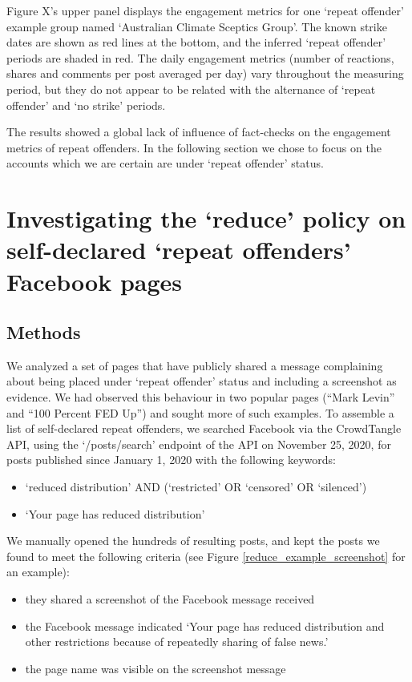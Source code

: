 \documentclass[11pt,a4paper]{article}
\begin{document}
Figure X's upper panel displays the engagement metrics for one `repeat offender' example group named ‘Australian Climate Sceptics Group’. The known strike dates are shown as red lines at the bottom, and the inferred ‘repeat offender’ periods are shaded in red. The daily engagement metrics (number of reactions, shares and comments per post averaged per day) vary throughout the measuring period, but they do not appear to be related with the alternance of `repeat offender' and `no strike' periods.

The results showed a global lack of influence of fact-checks on the engagement metrics of repeat offenders. In the following section we chose to focus on the accounts which we are certain are under `repeat offender' status. 

\section{Investigating the `reduce’ policy on self-declared ‘repeat offenders’ Facebook pages}

\subsection{Methods}

We analyzed a set of pages that have publicly shared a message complaining about being placed under ‘repeat offender’ status and including a screenshot as evidence. We had observed this behaviour in two popular pages (“Mark Levin” and “100 Percent FED Up”) and sought more of such examples. To assemble a list of self-declared repeat offenders, we searched Facebook via the CrowdTangle API, using the `/posts/search' endpoint of the API on November 25, 2020, for posts published since January 1, 2020 with the following keywords:
\begin{itemize}
\item `reduced distribution' AND (`restricted' OR `censored' OR `silenced')
\item `Your page has reduced distribution'
\end{itemize}

We manually opened the hundreds of resulting posts, and kept the posts we found to meet the following criteria (see Figure \ref{reduce_example_screenshot} for an example):
\begin{itemize}
\item they shared a screenshot of the Facebook message received
\item the Facebook message indicated `Your page has reduced distribution and other restrictions because of repeatedly sharing of false news.'
\item the page name was visible on the screenshot message
\end{itemize}
\end{document}
